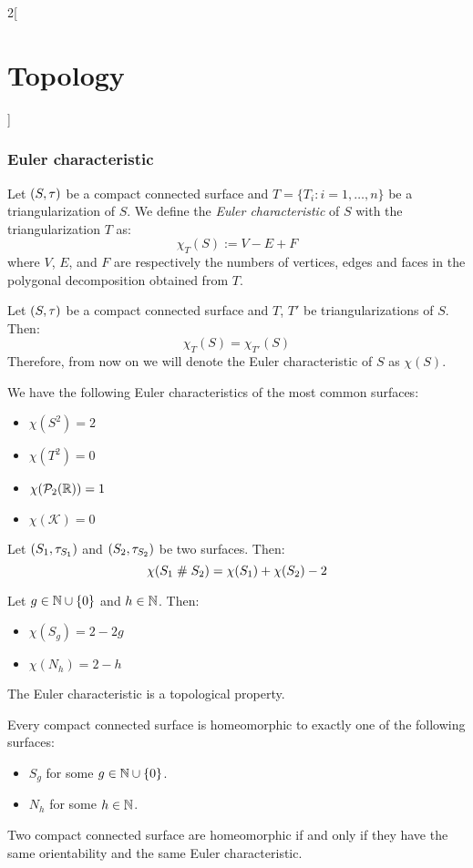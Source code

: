 \documentclass[../../../main.tex]{subfiles}
\begin{document}
\begin{multicols}{2}[\section{Topology}]
  \subsubsection{Euler characteristic}
  \begin{definition}
    Let $(S,\tau)$ be a compact connected surface and $T=\{T_i:i=1,\ldots,n\}$ be a triangularization of $S$. We define the \emph{Euler characteristic} of $S$ with the triangularization $T$ as: $$\chi_T(S):=V-E+F$$ where $V$, $E$, and $F$ are respectively the numbers of vertices, edges and faces in the polygonal decomposition obtained from $T$.
  \end{definition}
  \begin{prop}
    Let $(S,\tau)$ be a compact connected surface and $T$, $T'$ be triangularizations of $S$. Then: $$\chi_T(S)=\chi_{T'}(S)$$ Therefore, from now on we will denote the Euler characteristic of $S$ as $\chi(S)$.
  \end{prop}
  \begin{prop}
    We have the following Euler characteristics of the most common surfaces:
    \begin{itemize}
      \item $\chi(S^2)=2$
      \item $\chi(T^2)=0$
      \item $\chi(\mathcal{P}_2(\mathbb{R}))=1$
      \item $\chi(\mathcal{K})=0$
    \end{itemize}
  \end{prop}
  \begin{prop}
    Let $(S_1,\tau_{S_1})$ and $(S_2,\tau_{S_2})$ be two surfaces. Then: $$\chi(S_1\mathrel{\#} S_2)=\chi(S_1)+\chi(S_2)-2$$
  \end{prop}
  \begin{corollary}
    Let $g\in\mathbb{N}\cup\{0\}$ and $h\in\mathbb{N}$. Then:
    \begin{itemize}
      \item $\chi(S_g)=2-2g$
      \item $\chi(N_h)=2-h$
    \end{itemize}
  \end{corollary}
  \begin{theorem}
    The Euler characteristic is a topological property.
  \end{theorem}
  \begin{theorem}
    Every compact connected surface is homeomorphic to exactly one of the following surfaces:
    \begin{itemize}
      \item $S_g$ for some $g\in\mathbb{N}\cup\{0\}$.
      \item $N_h$ for some $h\in\mathbb{N}$.
    \end{itemize}
  \end{theorem}
  \begin{corollary}
    Two compact connected surface are homeomorphic if and only if they have the same orientability and the same Euler characteristic.
  \end{corollary}
\end{multicols}
\end{document}
